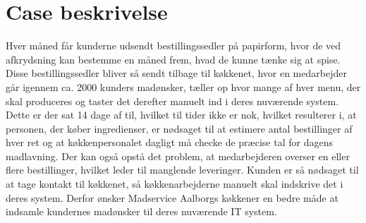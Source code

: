 \section{Case beskrivelse}
Hver måned får kunderne udsendt bestillingssedler på papirform, hvor de ved afkrydsning kan bestemme en måned frem, hvad de kunne tænke sig at spise.
Disse bestillingssedler bliver så sendt tilbage til køkkenet, hvor en medarbejder går igennem ca. 2000  kunders madønsker, tæller op hvor mange af hver menu, der skal produceres og taster det derefter manuelt ind i deres nuværende system.
Dette er der sat 14 dage af til, hvilket til tider ikke er nok, hvilket resulterer i, at personen, der køber ingredienser, er nødsaget til at estimere antal bestillinger af hver ret og at køkkenpersonalet dagligt må checke de præcise tal for dagens madlavning.
Der kan også opstå det problem, at medarbejderen overser en eller flere bestillinger, hvilket leder til manglende leveringer.
Kunden er så nødsaget til at tage kontakt til køkkenet, så køkkenarbejderne manuelt skal indskrive det i deres system.
Derfor ønsker Madservice Aalborgs køkkener en bedre måde at indsamle kundernes madønsker til deres nuværende IT system.